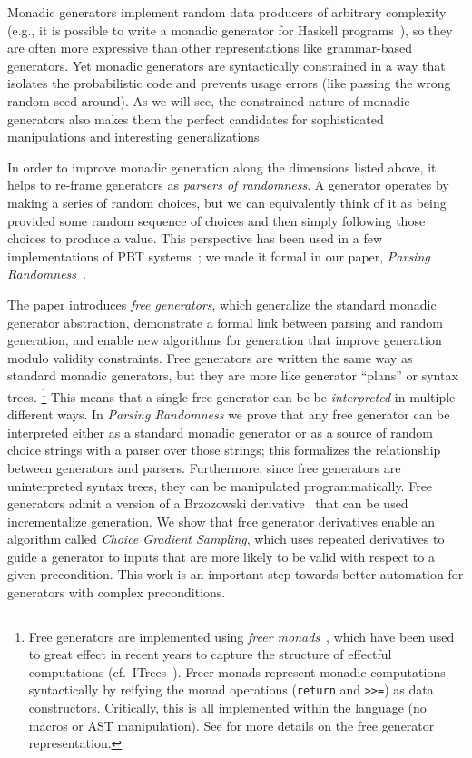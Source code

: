 Monadic generators implement random data producers of arbitrary complexity
(e.g., it is possible to write a monadic generator for Haskell
programs~\cite{palka_testing_2011}), so they are often more expressive than
other representations like grammar-based generators.  Yet monadic generators are
syntactically constrained in a way that isolates the probabilistic code and
prevents usage errors (like passing the wrong random seed around). As we will
see, the constrained nature of monadic generators also makes them the perfect
candidates for sophisticated manipulations and interesting generalizations.

In order to improve monadic generation along the dimensions listed
above, it helps to re-frame generators as {\em parsers of randomness}. A generator
operates by making a series of random choices, but we can equivalently think of
it as being provided some random sequence of choices and then simply following
those choices to produce a value. This perspective has been used in a few
implementations of PBT
systems~\cite{maciver2019hypothesis, dolan2017testing}; we made it
formal in our paper, {\em Parsing Randomness}~\cite{goldstein2022parsing}.

The paper introduces {\em free generators}, which generalize the standard
monadic generator abstraction, demonstrate a formal link between parsing and
random generation, and enable new algorithms for generation that improve
generation modulo validity constraints. Free generators are written the same
way as standard monadic generators, but they are more like generator ``plans''
or syntax trees.%
\footnote{Free generators are implemented using {\em freer
monads}~\cite{kiselyov2015freer}, which have been used to great effect in recent
years to capture the structure of effectful computations
(cf.~ITrees~\cite{old:xia2019interaction}). Freer monads represent
monadic computations syntactically by reifying the monad operations
(\lstinline{return} and \lstinline{>>=}) as data constructors. Critically, this
is all implemented within the language (no macros or AST
manipulation). See \cite{goldstein2022parsing} for more details on the
free generator representation.}
This means that a single free generator can be be {\em interpreted} in multiple
different ways. In {\em Parsing Randomness} we prove that any free generator can
be interpreted either as a standard monadic generator or as a source of
random choice strings with a parser over those strings; this formalizes the
relationship between generators and parsers. Furthermore, since free generators
are uninterpreted syntax trees, they can be manipulated programmatically. Free
generators admit a version of a Brzozowski
derivative~\cite{brzozowski1964derivatives} that can be used incrementalize
generation. We show that free generator derivatives enable an algorithm called
{\em Choice Gradient Sampling}, which uses repeated derivatives to guide a
generator to inputs that are more likely to be valid with respect to a given
precondition. This work is an important step towards better automation for
generators with complex preconditions.

